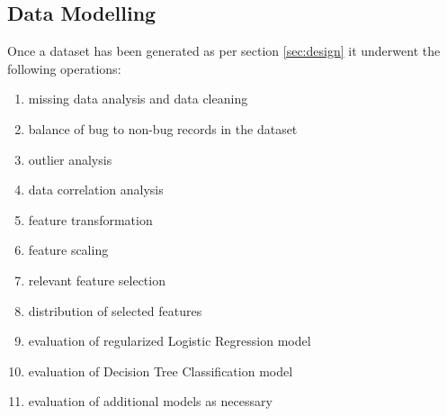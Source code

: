 \subsection{Data Modelling}

Once a dataset has been generated as per section \ref{sec:design} it underwent the following operations:
\begin{enumerate}\label{lst:dataset-ops}
    \item missing data analysis and data cleaning \label{lst:dataset-ops.item:data-cleaning}
    \item balance of bug to non-bug records in the dataset \label{lst:dataset-ops.item:bug-to-non-bug-balance}
    \item outlier analysis \label{lst:dataset-ops.item:outliers}
    \item data correlation analysis \label{lst:dataset-ops.item:data-correlation}
    \item feature transformation \label{lst:dataset-ops.item:feature-transformation}
    \item feature scaling \label{lst:dataset-ops.item:data-scaling}
    \item relevant feature selection \label{lst:dataset-ops.item:feature-selection}
    \item distribution of selected features \label{lst:dataset-ops.item:attribute-distribution}
    \item evaluation of regularized Logistic Regression model \label{lst:dataset-ops.item:ml-logistic-regression}
    \item evaluation of Decision Tree Classification model \label{lst:dataset-ops.item:ml-decision-tree}
    \item evaluation of additional models as necessary \label{lst:dataset-ops.item:ml-models-additional}
\end{enumerate}

